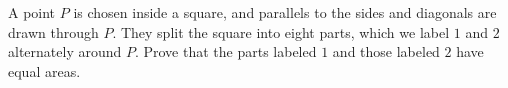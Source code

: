 A point $P$ is chosen inside a square, and parallels to the sides and diagonals are drawn through $P$. They split the square into eight parts, which we label $1$ and $2$ alternately around $P$. Prove that the parts labeled $1$ and those labeled $2$ have equal areas.

